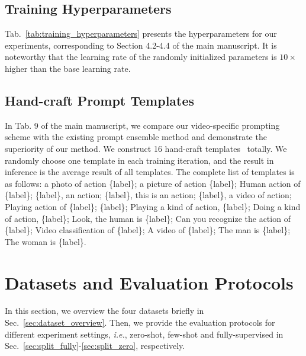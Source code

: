 \documentclass[runningheads]{llncs}
\begin{document}
\subsection{Training Hyperparameters}\label{sec:train_hyper}

Tab.~\ref{tab:training_hyperparameters} presents the hyperparameters for our experiments, corresponding to Section 4.2-4.4 of the main manuscript. It is noteworthy that the learning rate of the randomly initialized parameters is $10\times$ higher than the base learning rate.
\vspace{-0.3cm}
\subsection{Hand-craft Prompt Templates}\label{sec:prompt}
In Tab. 9 of the main manuscript, we compare our video-specific prompting scheme with the existing prompt ensemble method \cite{clip} and demonstrate the superiority of our method. We construct 16 hand-craft templates~\cite{wang2021actionclip} totally. We randomly choose one template in each training iteration, and the result in inference is the average result of all templates. The complete list of templates is as follows: a photo of action \{label\}; a picture of action \{label\};
Human action of \{label\}; \{label\}, an action; \{label\}, this is an action; \{label\}, a video of action; Playing action of \{label\}; \{label\}; Playing a kind of action, \{label\}; Doing a kind of action, \{label\}; Look, the human is \{label\}; Can you recognize the action of \{label\}; Video classification of \{label\}; A video of \{label\}; The man is \{label\}; The woman is \{label\}.


\section{Datasets and Evaluation Protocols}\label{sec:dataset}
In this section, we overview the four datasets briefly in Sec.~\ref{sec:dataset_overview}. 
Then, we provide the evaluation protocols for different experiment settings, \emph{i.e.}, zero-shot, few-shot and fully-supervised in Sec.~\ref{sec:split_fully}-\ref{sec:split_zero}, respectively.
\end{document}
